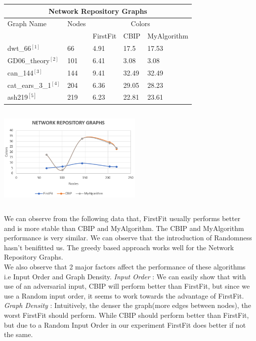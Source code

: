 \documentclass{article}
\begin{document}
\bigbreak
	\begin{minipage}{0.5\linewidth}
		 \begin{tabular}{||p{2.5cm} | p{0.8cm} | p{1.5cm} | p{1.5cm} | p{1.9cm} ||} 
			\hline
			\multicolumn{5}{|c|}{Network Repository Graphs} \\
			 \hline
			\hline
			Graph Name& Nodes & \multicolumn{3}{|c|}{Colors} \\
			\hline
 		 	& & FirstFit & CBIP & MyAlgorithm \\ [0.5ex] 
 			\hline\hline
			 dwt\_66$^{[1]}$& 66 & 4.91 & 17.5 & 17.53 \\ 
			 \hline
 			 GD06\_theory$^{[2]}$& 101 & 6.41 & 3.08 & 3.08 \\
 			\hline
			can\_144$^{[3]}$ & 144 & 9.41 & 32.49 & 32.49 \\
			 \hline
			 cat\_ears\_3\_1$^{[4]}$& 204 & 6.36 & 29.05 & 28.23 \\
 			\hline
 			ash219$^{[5]}$& 219 & 6.23 & 22.81 & 23.61\\ [1ex] 
 			\hline
		\end{tabular}
	\end{minipage}\hfill
	\begin{minipage}{5cm}
		\centering
		\includegraphics[height=5cm,width=7cm]{NetworkRepoGraph}
	\end{minipage}


We can observe from the following data that, FirstFit usually performs better and is more stable than CBIP and MyAlgorithm. The CBIP and 
MyAlgorithm performance is very similar. We can observe that the introduction of Randomness hasn't benifitted us. The greedy based approach
works well for the Network Repository Graphs. \\


We also observe that 2 major factors affect the performance of these algorithms i.e  Input Order and Graph Density.
\bigbreak
\textit{Input Order} : We can easily show that with use of an adversarial input, CBIP will perform better than FirstFit, but since we use a Random 
input order, it seems to work towards the advantage of FirstFit.\\
\bigbreak
\textit{Graph Density} : Intuitively, the denser the graph(more edges between nodes), the worst FirstFit should perform. While CBIP
should perform better than FirstFit, but due to a Random Input Order in our experiment FirstFit does better if not the same.\\ 
\end{document}
